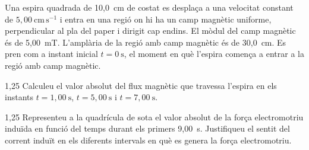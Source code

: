 Una espira quadrada de 10,0~cm de costat es desplaça a una velocitat constant de $5,00\ \mathrm{cm\,s^{-1}}$ i entra en una regió on hi ha un camp magnètic uniforme, perpendicular al pla del paper i dirigit cap endins. El mòdul del camp magnètic és de 5,00~mT. L'amplària de la regió amb camp magnètic és de 30,0~cm. Es pren com a instant inicial $t = 0\ \mathrm{s}$, el moment en què l'espira comença a entrar a la regió amb camp magnètic.


\begin{apartat}{1,25}
Calculeu el valor absolut del flux magnètic que travessa l'espira en els instants $t = 1,00\ \mathrm{s}$, $t = 5,00\ \mathrm{s}$ i $t = 7,00\ \mathrm{s}$.
\end{apartat}

\begin{apartat}{1,25}
Representeu a la quadrícula de sota el valor absolut de la força electromotriu induïda en funció del temps durant els primers 9,00~s. Justifiqueu el sentit del corrent induït en els diferents intervals en què es genera la força electromotriu.
\end{apartat}

